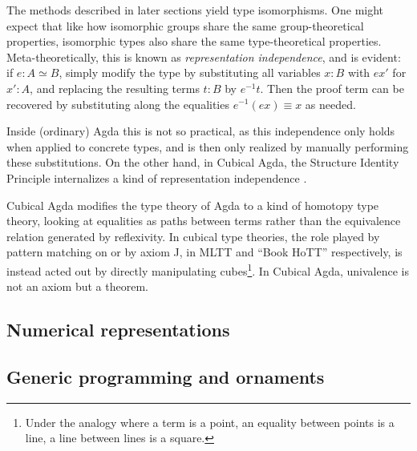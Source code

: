The methods described in later sections yield type isomorphisms. One might expect that like how isomorphic groups share the same group-theoretical properties, isomorphic types also share the same type-theoretical properties. Meta-theoretically, this is known as \emph{representation independence}, and is evident: if $e: A \simeq B$, simply modify the type by substituting all variables $x : B$ with $e x'$ for $x' : A$, and replacing the resulting terms $t : B$ by $e^{-1} t$. Then the proof term can be recovered by substituting along the equalities $e^{-1}(e x) \equiv x$ as needed.

Inside (ordinary) Agda this is not so practical, as this independence only holds when applied to concrete types, and is then only realized by manually performing these substitutions. On the other hand, in Cubical Agda, the Structure Identity Principle internalizes a kind of representation independence \cite{iri}.

Cubical Agda modifies the type theory of Agda to a kind of homotopy type theory, looking at equalities as paths between terms rather than the equivalence relation generated by reflexivity. In cubical type theories, the role played by pattern matching on  or by axiom J, in MLTT and ``Book HoTT'' respectively, is instead acted out by directly manipulating cubes\footnote{Under the analogy where a term is a point, an equality between points is a line, a line between lines is a square.}. In Cubical Agda, univalence
is not an axiom but a theorem.



\subsection{Numerical representations}

\subsection{Generic programming and ornaments}

